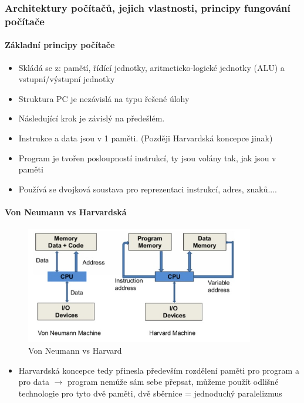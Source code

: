 \documentclass[10pt,a4paper]{article}
\begin{document}
\subsubsection{Architektury počítačů, jejich vlastnosti, principy fungování počítače}
\paragraph{Základní principy počítače}
\begin{itemize}
\item Skládá se z: pamětí, řídící jednotky, aritmeticko-logické jednotky (ALU) a vstupní/výstupní jednotky
\item Struktura PC je nezávislá na typu řešené úlohy
\item Následující krok je závislý na předešlém.
\item Instrukce a data jsou v 1 paměti. (Později Harvardská koncepce jinak)
\item Program je tvořen posloupností instrukcí, ty jsou volány tak, jak jsou v paměti
\item Používá se dvojková soustava pro reprezentaci instrukcí, adres, znaků....
\end{itemize}

\paragraph{ Von Neumann vs Harvardská}

\begin{figure}[ht]
    \centering
    \includegraphics[width=10cm]{app_monolit-arch.png}
    \caption{Von Neumann vs Harvard}
    \label{fig:app_monolit-arch}
\end{figure}
\begin{itemize}
    \item Harvardská koncepce tedy přinesla především rozdělení paměti pro program a pro data $\rightarrow$ program nemůže sám sebe přepsat, můžeme použít odlišné technologie pro tyto dvě paměti, dvě sběrnice = jednoduchý paralelizmus
\end{itemize}
\end{document}

